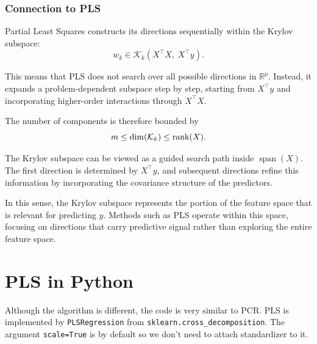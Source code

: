\documentclass[
  letterpaper,
  DIV=11,
  numbers=noendperiod]{scrreprt}
\theoremstyle{definition}
\theoremstyle{definition}
\theoremstyle{plain}
\theoremstyle{plain}
\theoremstyle{remark}
\begin{document}
\subsubsection{Connection to PLS}\label{connection-to-pls}

Partial Least Squares constructs its directions sequentially within the
Krylov subspace: \[
w_k \in \mathcal{K}_k(X^\top X,\; X^\top y).
\]

This means that PLS does not search over all possible directions in
\(\mathbb{R}^p\). Instead, it expands a problem-dependent subspace step
by step, starting from \(X^\top y\) and incorporating higher-order
interactions through \(X^\top X\).

The number of components is therefore bounded by \[
m \le \dim(\mathcal{K}_k) \le \rank(X).
\]

\begin{tcolorbox}[enhanced jigsaw, arc=.35mm, bottomrule=.15mm, bottomtitle=1mm, breakable, colback=white, colbacktitle=quarto-callout-note-color!10!white, colframe=quarto-callout-note-color-frame, coltitle=black, left=2mm, leftrule=.75mm, opacityback=0, opacitybacktitle=0.6, rightrule=.15mm, title=\textcolor{quarto-callout-note-color}{\faInfo}\hspace{0.5em}{Note}, titlerule=0mm, toprule=.15mm, toptitle=1mm]

The Krylov subspace can be viewed as a guided search path inside
\(\operatorname{span}(X)\). The first direction is determined by
\(X^\top y\), and subsequent directions refine this information by
incorporating the covariance structure of the predictors.

In this sense, the Krylov subspace represents the portion of the feature
space that is relevant for predicting \(y\). Methods such as PLS operate
within this space, focusing on directions that carry predictive signal
rather than exploring the entire feature space.

\end{tcolorbox}

\section{PLS in Python}\label{pls-in-python}

Although the algorithm is different, the code is very similar to PCR.
PLS is implemented by \texttt{PLSRegression} from
\texttt{sklearn.cross\_decomposition}. The argument \texttt{scale=True}
is by default so we don't need to attach standardizer to it.
\end{document}
